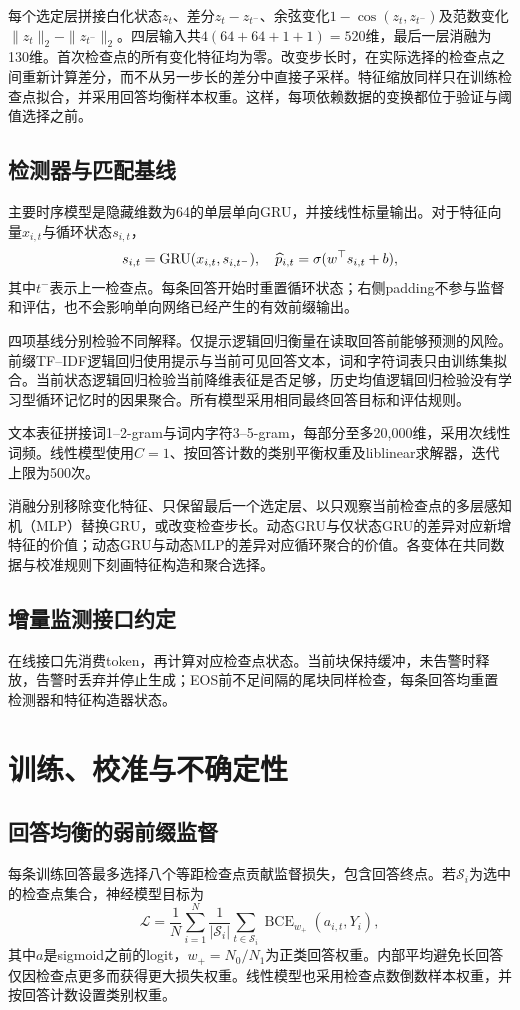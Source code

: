 \PCAVarianceZH{}

每个选定层拼接白化状态$z_t$、差分$z_t-z_{t^-}$、余弦变化$1-\cos(z_t,z_{t^-})$及范数变化$\|z_t\|_2-\|z_{t^-}\|_2$。四层输入共$4(64+64+1+1)=520$维，最后一层消融为130维。首次检查点的所有变化特征均为零。改变步长时，在实际选择的检查点之间重新计算差分，而不从另一步长的差分中直接子采样。特征缩放同样只在训练检查点拟合，并采用回答均衡样本权重。这样，每项依赖数据的变换都位于验证与阈值选择之前。

\subsection{检测器与匹配基线}
主要时序模型是隐藏维数为64的单层单向GRU，并接线性标量输出。对于特征向量$x_{i,t}$与循环状态$s_{i,t}$，
\begin{equation*}
 s_{i,t}=\operatorname{GRU}(x_{i,t},s_{i,t^-}),\quad
 \widehat p_{i,t}=\sigma(w^\top s_{i,t}+b),
\end{equation*}
其中$t^-$表示上一检查点。每条回答开始时重置循环状态；右侧padding不参与监督和评估，也不会影响单向网络已经产生的有效前缀输出。

四项基线分别检验不同解释。仅提示逻辑回归衡量在读取回答前能够预测的风险。前缀TF--IDF逻辑回归使用提示与当前可见回答文本，词和字符词表只由训练集拟合。当前状态逻辑回归检验当前降维表征是否足够，历史均值逻辑回归检验没有学习型循环记忆时的因果聚合。所有模型采用相同最终回答目标和评估规则。

文本表征拼接词1--2-gram与词内字符3--5-gram，每部分至多20,000维，采用次线性词频。线性模型使用$C=1$、按回答计数的类别平衡权重及liblinear求解器，迭代上限为500次。

消融分别移除变化特征、只保留最后一个选定层、以只观察当前检查点的多层感知机（MLP）替换GRU，或改变检查步长。动态GRU与仅状态GRU的差异对应新增特征的价值；动态GRU与动态MLP的差异对应循环聚合的价值。各变体在共同数据与校准规则下刻画特征构造和聚合选择。

\subsection{增量监测接口约定}
在线接口先消费token，再计算对应检查点状态。当前块保持缓冲，未告警时释放，告警时丢弃并停止生成；EOS前不足间隔的尾块同样检查，每条回答均重置检测器和特征构造器状态。

\section{训练、校准与不确定性}\label{sec:protocol}
\subsection{回答均衡的弱前缀监督}
每条训练回答最多选择八个等距检查点贡献监督损失，包含回答终点。若$\mathcal S_i$为选中的检查点集合，神经模型目标为
\begin{equation}
 \mathcal L=\frac{1}{N}\sum_{i=1}^N\frac{1}{|\mathcal S_i|}
 \sum_{t\in\mathcal S_i}\operatorname{BCE}_{w_+}(a_{i,t},Y_i),
 \label{eq:loss}
\end{equation}
其中$a$是sigmoid之前的logit，$w_+=N_0/N_1$为正类回答权重。内部平均避免长回答仅因检查点更多而获得更大损失权重。线性模型也采用检查点数倒数样本权重，并按回答计数设置类别权重。

